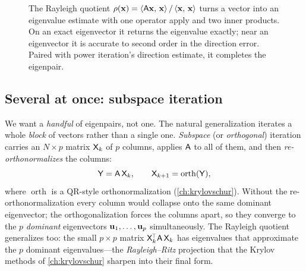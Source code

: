 \begin{figure}[t]
\centering
{}
\caption[The Rayleigh quotient]{The Rayleigh quotient $\rho(\mathbf{x})=\left\langle \mathsf{A}
\mathbf{x},\, \mathbf{x}\right\rangle/\left\langle \mathbf{x},\, \mathbf{x}\right\rangle$ turns a vector into an eigenvalue estimate with one
operator apply and two inner products. On an exact eigenvector it returns the
eigenvalue exactly; near an eigenvector it is accurate to second order in the
direction error. Paired with power iteration's direction estimate, it completes
the eigenpair.}
\label{fig:rayleigh}
\end{figure}

\subsection{Several at once: subspace iteration}

We want a \emph{handful} of eigenpairs, not one. The natural generalization
iterates a whole \emph{block} of vectors rather than a single one.
\emph{Subspace} (or \emph{orthogonal}) iteration carries an $N\times p$ matrix
$\mathsf{X}_k$ of $p$ columns, applies $\mathsf{A}$ to all of them, and then
\emph{re-orthonormalizes} the columns:
\begin{equation}
  \mathsf{Y} = \mathsf{A}\,\mathsf{X}_k,\qquad
  \mathsf{X}_{k+1} = \operatorname{orth}(\mathsf{Y}),
\end{equation}
where $\operatorname{orth}$ is a QR-style orthonormalization
(\cref{ch:krylovschur}). Without the re-orthonormalization every column would
collapse onto the same dominant eigenvector; the orthogonalization forces the
columns apart, so they converge to the $p$ \emph{dominant} eigenvectors
$\mathbf{u}_1,\dots,\mathbf{u}_p$ simultaneously. The Rayleigh quotient generalizes too: the
small $p\times p$ matrix $\mathsf{X}_k^{\!\top}\mathsf{A}\,\mathsf{X}_k$ has eigenvalues
that approximate the $p$ dominant eigenvalues---the \emph{Rayleigh--Ritz}
projection that the Krylov methods of \cref{ch:krylovschur} sharpen into their
final form.

